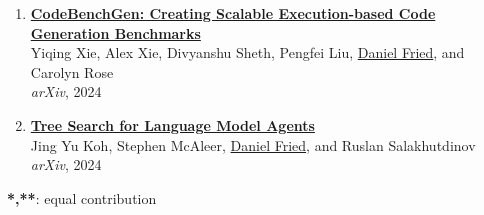 \begin{enumerate}[leftmargin=-1mm,partopsep=0pt]
\item \href{https://arxiv.org/abs/2404.00566}{\textbf{CodeBenchGen: Creating Scalable Execution-based Code Generation Benchmarks}} \\
  Yiqing Xie, Alex Xie, Divyanshu Sheth, Pengfei Liu, \underline{Daniel Fried}, and Carolyn Rose\\
  \emph{arXiv}, 2024

\item \href{https://arxiv.org/abs/2407.01476}{\textbf{Tree Search for Language Model Agents}} \\
  Jing Yu Koh, Stephen McAleer, \underline{Daniel Fried}, and Ruslan Salakhutdinov\\
  \emph{arXiv}, 2024

\end{enumerate}

\textbf{*,**}: equal contribution
